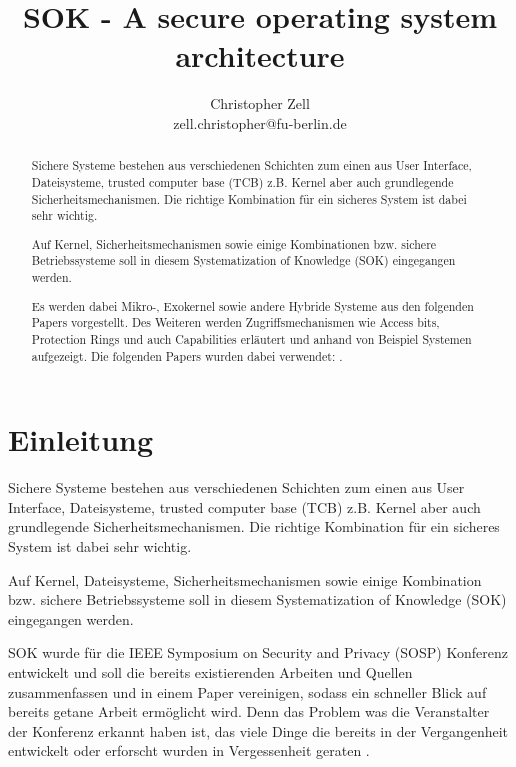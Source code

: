 \documentclass[german, 9pt,technote]{IEEEtran}
\title{SOK - A secure operating system architecture}
\author{Christopher Zell\\
        zell.christopher@fu-berlin.de}
\begin{document}
\maketitle

  \begin{abstract}
    Sichere Systeme bestehen aus verschiedenen Schichten zum einen aus User Interface, Dateisysteme, trusted computer base (TCB)
    z.B. Kernel aber auch grundlegende Sicherheitsmechanismen. Die richtige Kombination f\"ur ein sicheres System ist dabei sehr wichtig.
    
    Auf Kernel, Sicherheitsmechanismen sowie einige Kombinationen bzw. sichere Betriebssysteme soll in diesem
    Systematization of Knowledge (SOK) eingegangen werden.
    
    Es werden dabei Mikro-, Exokernel sowie andere Hybride Systeme aus den folgenden Papers 
    \cite{inproc:micro, inproc:exo, inproc:spin, inproc:eros, inproc:asbestos} vorgestellt.
    Des Weiteren werden Zugriffsmechanismen wie Access bits, Protection Rings und auch Capabilities erl\"autert
    und anhand von Beispiel Systemen aufgezeigt. Die folgenden Papers wurden dabei verwendet:
    \cite{inproc:multics, inproc:protec-rings, inproc:unix, inproc:plan9, inproc:cap}.
  \end{abstract}
  
  \section{Einleitung} \label{sec:intro} 
    Sichere Systeme bestehen aus verschiedenen Schichten zum einen aus User Interface, Dateisysteme, trusted computer base (TCB)
    z.B. Kernel aber auch grundlegende Sicherheitsmechanismen. Die richtige Kombination f\"ur ein sicheres System ist dabei sehr wichtig.
    
    Auf Kernel, Dateisysteme, Sicherheitsmechanismen sowie einige Kombination bzw. sichere Betriebssysteme soll in diesem
    Systematization of Knowledge (SOK) eingegangen werden.
    
    SOK wurde f\"ur die IEEE Symposium on Security and Privacy (SOSP) Konferenz
    entwickelt und soll die bereits existierenden Arbeiten und Quellen zusammenfassen
    und in einem Paper vereinigen, sodass ein schneller Blick auf bereits getane
    Arbeit erm\"oglicht wird. Denn das Problem was die Veranstalter der Konferenz
    erkannt haben ist, das viele Dinge die bereits in der Vergangenheit entwickelt oder
    erforscht wurden in Vergessenheit geraten \cite{Url:sok}.
    
\end{document}
